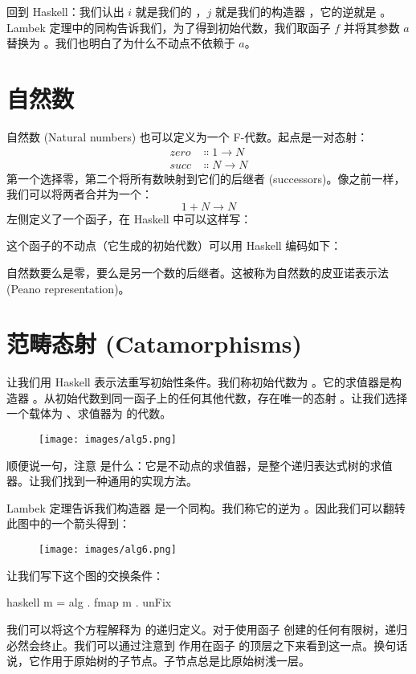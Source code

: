 回到 Haskell：我们认出 $i$ 就是我们的 ，$j$ 就是我们的构造器 ，它的逆就是 。Lambek 定理中的同构告诉我们，为了得到初始代数，我们取函子 $f$ 并将其参数 $a$ 替换为 。我们也明白了为什么不动点不依赖于 $a$。

\section{自然数}

自然数 (Natural numbers) 也可以定义为一个 F-代数。起点是一对态射：
\begin{align*}
  zero & \Colon 1 \to N \\
  succ & \Colon N \to N
\end{align*}
第一个选择零，第二个将所有数映射到它们的后继者 (successors)。像之前一样，我们可以将两者合并为一个：
\[1 + N \to N\]
左侧定义了一个函子，在 Haskell 中可以这样写：

这个函子的不动点（它生成的初始代数）可以用 Haskell 编码如下：

自然数要么是零，要么是另一个数的后继者。这被称为自然数的皮亚诺表示法 (Peano representation)。

\section{范畴态射 (Catamorphisms)}

让我们用 Haskell 表示法重写初始性条件。我们称初始代数为 。它的求值器是构造器 。从初始代数到同一函子上的任何其他代数，存在唯一的态射 。让我们选择一个载体为 、求值器为  的代数。

\begin{figure}[H]
  \centering
  \texttt{[image: images/alg5.png]}
\end{figure}

\noindent
顺便说一句，注意  是什么：它是不动点的求值器，是整个递归表达式树的求值器。让我们找到一种通用的实现方法。

Lambek 定理告诉我们构造器  是一个同构。我们称它的逆为 。因此我们可以翻转此图中的一个箭头得到：

\begin{figure}[H]
  \centering
  \texttt{[image: images/alg6.png]}
\end{figure}

\noindent
让我们写下这个图的交换条件：

\begin{snip}{haskell}
m = alg . fmap m . unFix
\end{snip}
我们可以将这个方程解释为  的递归定义。对于使用函子  创建的任何有限树，递归必然会终止。我们可以通过注意到  作用在函子  的顶层之下来看到这一点。换句话说，它作用于原始树的子节点。子节点总是比原始树浅一层。

